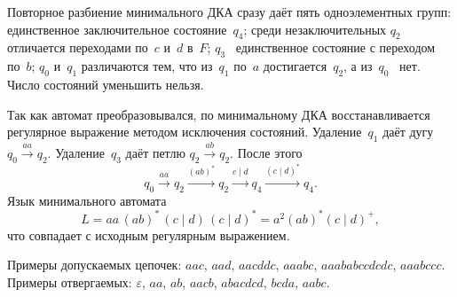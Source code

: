 Повторное разбиение минимального ДКА сразу даёт пять одноэлементных групп: единственное заключительное состояние~$q_{4}$; среди незаключительных $q_{2}$ отличается переходами по~$c$ и~$d$ в~$F$; $q_{3}$~\mdash{} единственное состояние с переходом по~$b$; $q_{0}$ и~$q_{1}$ различаются тем, что из~$q_{1}$ по~$a$ достигается~$q_{2}$, а из~$q_{0}$~\mdash{} нет. Число состояний уменьшить нельзя.

Так как автомат преобразовывался, по минимальному ДКА восстанавливается регулярное выражение методом исключения состояний. Удаление~$q_{1}$ даёт дугу $q_{0}\xrightarrow{aa}q_{2}$. Удаление~$q_{3}$ даёт петлю $q_{2}\xrightarrow{ab}q_{2}$. После этого
\[
	q_{0}\xrightarrow{aa}q_{2}\xrightarrow{(ab)^{*}}q_{2}\xrightarrow{c\mid d}q_{4}\xrightarrow{(c\mid d)^{*}}q_{4}.
\]
Язык минимального автомата
\[
	L = aa\,(ab)^{*}\,(c\mid d)\,(c\mid d)^{*} = a^{2}(ab)^{*}(c\mid d)^{+},
\]
что совпадает с исходным регулярным выражением.

Примеры допускаемых цепочек: $aac$, $aad$, $aacddc$, $aaabc$, $aaababccdcdc$, $aaabccc$. Примеры отвергаемых: $\varepsilon$, $aa$, $ab$, $aacb$, $abacdcd$, $bcda$, $aabc$.
